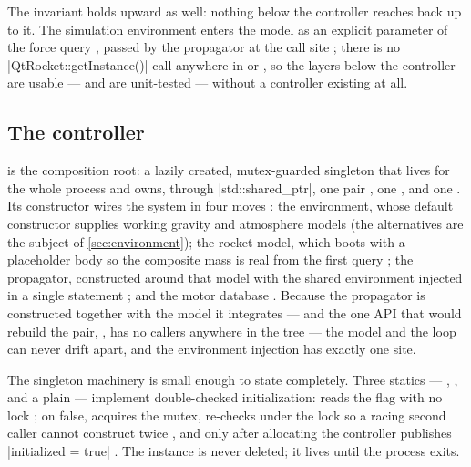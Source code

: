 The invariant holds upward as well: nothing below the controller reaches back up to it.
The simulation environment enters the model as an explicit parameter of the force query
, passed by the propagator at the call site
; there is no \cppinline|QtRocket::getInstance()| call
anywhere in  or , so the layers below the controller are usable
--- and are unit-tested --- without a controller existing at all.

\subsection{The  controller}\label{sec:overview-controller}

 is the composition root: a lazily created, mutex-guarded singleton that
lives for the whole process and owns, through \cppinline|std::shared_ptr|, one
 pair , one 
, and one  . Its
constructor wires the system in four moves : the environment, whose
default constructor supplies working gravity and atmosphere models 
(the alternatives are the subject of \cref{sec:environment}); the rocket model, which
boots with a placeholder body so the composite mass is real from the first query
; the propagator, constructed around that model with the
shared environment injected in a single statement ; and the motor
database . Because the propagator is constructed together with the
model it integrates --- and the one API that would rebuild the pair, , has
no callers anywhere in the tree  --- the model and the loop can never
drift apart, and the environment injection has exactly one site.

The singleton machinery is small enough to state completely. Three statics ---
, , and a plain  
--- implement double-checked initialization:  reads the flag with no
lock ; on false,  acquires the mutex, re-checks under
the lock so a racing second caller cannot construct twice , and only
after allocating the controller publishes \cppinline|initialized = true|
. The instance is never deleted; it lives until the process exits.

